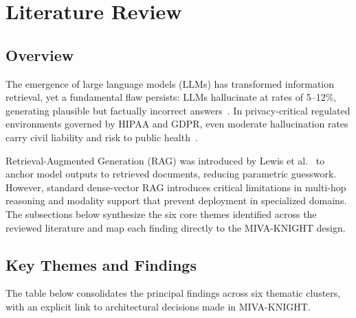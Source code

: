 \documentclass[12pt, a4paper]{article}
\begin{document}
\newpage



\section{Literature Review}

\subsection{Overview}

The emergence of large language models (LLMs) has transformed information
retrieval, yet a fundamental flaw persists: LLMs hallucinate at rates of
5--12\%, generating plausible but factually incorrect
answers~\cite{zhang2023sirens,ji2023survey}. In privacy-critical regulated
environments governed by HIPAA and GDPR, even moderate hallucination rates
carry civil liability and risk to public health~\cite{tang2024multihop}.

Retrieval-Augmented Generation (RAG) was introduced by Lewis et
al.~\cite{lewis2020rag} to anchor model outputs to retrieved documents,
reducing parametric guesswork. However, standard dense-vector RAG introduces
critical limitations in multi-hop reasoning and modality support that prevent
deployment in specialized domains. The subsections below synthesize the six core
themes identified across the reviewed literature and map each finding directly
to the MIVA-KNIGHT design.

\subsection{Key Themes and Findings}

The table below consolidates the principal findings across six thematic
clusters, with an explicit link to architectural decisions made in MIVA-KNIGHT.
\end{document}
